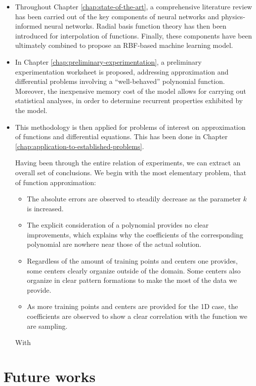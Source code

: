 \documentclass[12pt]{report} %
\begin{document}
\begin{itemize}
  \item Throughout Chapter \ref{chap:state-of-the-art}, a comprehensive literature review has been carried out of the key components of neural networks and physics-informed neural networks. Radial basis function theory has then been introduced for interpolation of functions. Finally, these components have been ultimately combined to propose an RBF-based machine learning model.
  \item In Chapter \ref{chap:preliminary-experimentation}, a preliminary experimentation worksheet is proposed, addressing approximation and differential problems involving a ``well-behaved'' polynomial function. Moreover, the inexpensive memory cost of the model allows for carrying out statistical analyses, in order to determine recurrent properties exhibited by the model.
  \item This methodology is then applied for problems of interest on approximation of functions and differential equations. This has been done in Chapter \ref{chap:application-to-established-problems}. 
  
  Having been through the entire relation of experiments, we can extract an overall set of conclusions. We begin with the most elementary problem, that of function approximation:\begin{itemize}
    \item The absolute errors are observed to steadily decrease as the parameter $k$ is increased. 
    \item The explicit consideration of a polynomial provides no clear improvements, which explains why the coefficients of the corresponding polynomial are nowhere near those of the actual solution.
    \item Regardless of the amount of training points and centers one provides, some centers clearly organize outside of the domain. Some centers also organize in clear pattern formations to make the most of the data we provide.
    \item As more training points and centers are provided for the 1D case, the coefficients are observed to show a clear correlation with the function we are sampling.
  \end{itemize}

With 

\end{itemize}

\section*{Future works}
\end{document}
